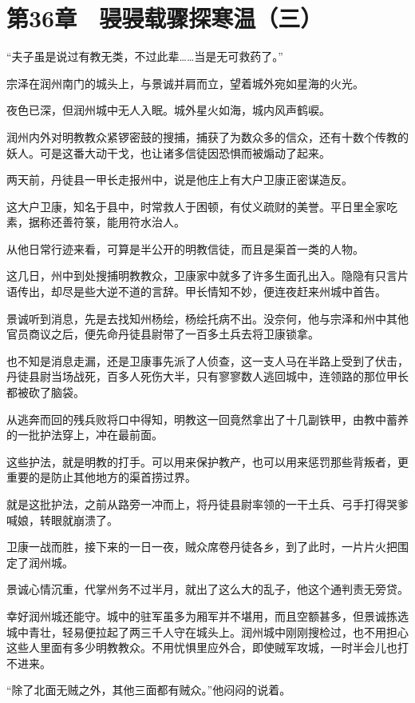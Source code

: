 \section{第36章　骎骎载骤探寒温（三）}

“夫子虽是说过有教无类，不过此辈……当是无可救药了。”

宗泽在润州南门的城头上，与景诚并肩而立，望着城外宛如星海的火光。

夜色已深，但润州城中无人入眠。城外星火如海，城内风声鹤唳。

润州内外对明教教众紧锣密鼓的搜捕，捕获了为数众多的信众，还有十数个传教的妖人。可是这番大动干戈，也让诸多信徒因恐惧而被煽动了起来。

两天前，丹徒县一甲长走报州中，说是他庄上有大户卫康正密谋造反。

这大户卫康，知名于县中，时常救人于困顿，有仗义疏财的美誉。平日里全家吃素，据称还善符箓，能用符水治人。

从他日常行迹来看，可算是半公开的明教信徒，而且是渠首一类的人物。

这几日，州中到处搜捕明教教众，卫康家中就多了许多生面孔出入。隐隐有只言片语传出，却尽是些大逆不道的言辞。甲长情知不妙，便连夜赶来州城中首告。

景诚听到消息，先是去找知州杨绘，杨绘托病不出。没奈何，他与宗泽和州中其他官员商议之后，便先命丹徒县尉带了一百多土兵去将卫康锁拿。

也不知是消息走漏，还是卫康事先派了人侦查，这一支人马在半路上受到了伏击，丹徒县尉当场战死，百多人死伤大半，只有寥寥数人逃回城中，连领路的那位甲长都被砍了脑袋。

从逃奔而回的残兵败将口中得知，明教这一回竟然拿出了十几副铁甲，由教中蓄养的一批护法穿上，冲在最前面。

这些护法，就是明教的打手。可以用来保护教产，也可以用来惩罚那些背叛者，更重要的是防止其他地方的渠首捞过界。

就是这批护法，之前从路旁一冲而上，将丹徒县尉率领的一干土兵、弓手打得哭爹喊娘，转眼就崩溃了。

卫康一战而胜，接下来的一日一夜，贼众席卷丹徒各乡，到了此时，一片片火把围定了润州城。

景诚心情沉重，代掌州务不过半月，就出了这么大的乱子，他这个通判责无旁贷。

幸好润州城还能守。城中的驻军虽多为厢军并不堪用，而且空额甚多，但景诚拣选城中青壮，轻易便拉起了两三千人守在城头上。润州城中刚刚搜检过，也不用担心这些人里面有多少明教教众。不用忧惧里应外合，即使贼军攻城，一时半会儿也打不进来。

“除了北面无贼之外，其他三面都有贼众。”他闷闷的说着。

